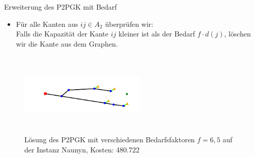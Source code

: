 \documentclass{beamer}
\begin{document}
		\begin{frame}{Erweiterung des P2PGK mit Bedarf}
			\begin{itemize}
				\item F\"ur alle Kanten aus $ij \in A_2$ \"uberpr\"ufen wir:\\
				Falls die Kapazit\"at der Kante $ij$ kleiner ist als der Bedarf  $f \cdot d(j)$,
				l\"oschen wir die Kante aus dem Graphen.
			\end{itemize}
			\begin{figure}[h]
				\centering
				\includegraphics[height=4cm, width=6cm]{./Bilder/P2PGK_Naunyn_demand6_5_duration0}
				\caption{Lösung des P2PGK mit verschiedenen Bedarfsfaktoren $f = 6,5$ auf der Instanz Naunyn, Kosten: 480.722}
			\end{figure}
		\end{frame}
		
\end{document}
